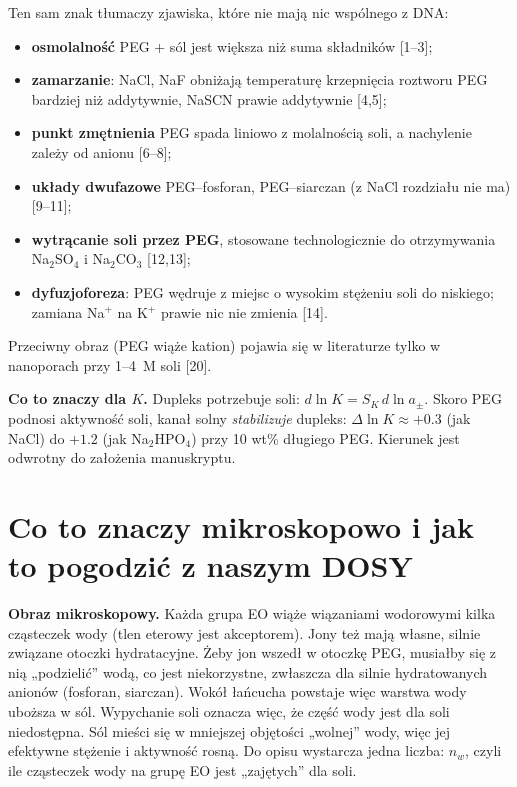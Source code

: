 \documentclass[11pt,a4paper]{article}
\begin{document}
Ten sam znak tłumaczy zjawiska, które nie mają nic wspólnego z DNA:
\begin{itemize}
\item \textbf{osmolalność} PEG + sól jest większa niż suma składników [1--3];
\item \textbf{zamarzanie}: NaCl, NaF obniżają temperaturę krzepnięcia roztworu PEG bardziej niż addytywnie, NaSCN prawie addytywnie [4,5];
\item \textbf{punkt zmętnienia} PEG spada liniowo z molalnością soli, a nachylenie zależy od anionu [6--8];
\item \textbf{układy dwufazowe} PEG--fosforan, PEG--siarczan (z NaCl rozdziału nie ma) [9--11];
\item \textbf{wytrącanie soli przez PEG}, stosowane technologicznie do otrzymywania Na$_2$SO$_4$ i Na$_2$CO$_3$ [12,13];
\item \textbf{dyfuzjoforeza}: PEG wędruje z miejsc o wysokim stężeniu soli do niskiego; zamiana Na$^+$ na K$^+$ prawie nic nie zmienia [14].
\end{itemize}
Przeciwny obraz (PEG wiąże kation) pojawia się w literaturze tylko w nanoporach przy 1--4~M soli [20].

\textbf{Co to znaczy dla $K$.} Dupleks potrzebuje soli: $d\ln K=S_K\,d\ln a_\pm$. Skoro PEG podnosi aktywność soli, kanał solny \emph{stabilizuje} dupleks: $\Delta\ln K\approx+0.3$ (jak NaCl) do $+1.2$ (jak Na$_2$HPO$_4$) przy 10 wt\% długiego PEG. Kierunek jest odwrotny do założenia manuskryptu.

\section{Co to znaczy mikroskopowo i jak to pogodzić z naszym DOSY}

\textbf{Obraz mikroskopowy.} Każda grupa EO wiąże wiązaniami wodorowymi kilka cząsteczek wody (tlen eterowy jest akceptorem). Jony też mają własne, silnie związane otoczki hydratacyjne. Żeby jon wszedł w otoczkę PEG, musiałby się z nią „podzielić” wodą, co jest niekorzystne, zwłaszcza dla silnie hydratowanych anionów (fosforan, siarczan). Wokół łańcucha powstaje więc warstwa wody uboższa w sól. Wypychanie soli oznacza więc, że część wody jest dla soli niedostępna. Sól mieści się w mniejszej objętości „wolnej” wody, więc jej efektywne stężenie i aktywność rosną. Do opisu wystarcza jedna liczba: $n_w$, czyli ile cząsteczek wody na grupę EO jest „zajętych” dla soli.
\end{document}
